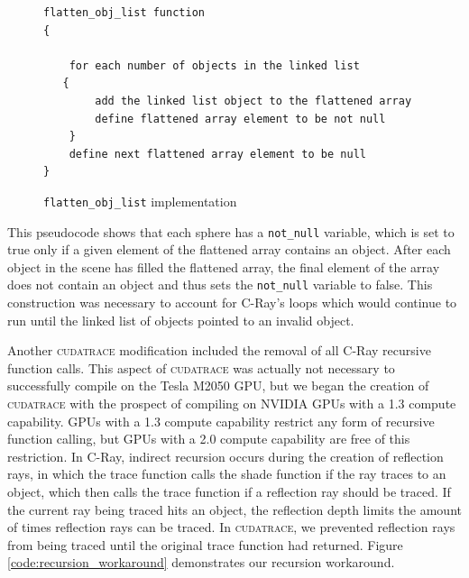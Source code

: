 \documentclass[12pt]{article}
\begin{document}
\begin{figure}
    \caption{\texttt{flatten\_obj\_list} implementation} \label{code:flatten_obj_list}
\begin{lstlisting}
flatten_obj_list function
{
   
    for each number of objects in the linked list 
   {
        add the linked list object to the flattened array
        define flattened array element to be not null
    }
    define next flattened array element to be null 
}
\end{lstlisting}
\end{figure}

This pseudocode shows that each sphere has a \texttt{not\_null} variable, which is set to true only if a given element of the flattened array contains an object. After each object in the scene has filled the flattened array, the final element of the array does not contain an object and thus sets the \texttt{not\_null} variable to false. This construction was necessary to account for C-Ray's loops which would continue to run until the linked list of objects pointed to an invalid object.

Another \textsc{cudatrace} modification included the removal of all C-Ray recursive function calls. This aspect of \textsc{cudatrace} was actually not necessary to successfully compile on the Tesla M2050 GPU, but we began the creation of \textsc{cudatrace} with the prospect of compiling on NVIDIA GPUs with a 1.3 compute capability. GPUs with a 1.3 compute capability restrict any form of recursive function calling, but GPUs with a 2.0 compute capability are free of this restriction. In C-Ray, indirect recursion occurs during the creation of reflection rays, in which the trace function calls the shade function if the ray traces to an object, which then calls the trace function if a reflection ray should be traced. If the current ray being traced hits an object, the reflection depth limits the amount of times reflection rays can be traced. In \textsc{cudatrace}, we prevented reflection rays from being traced until the original trace function had returned. Figure \ref{code:recursion_workaround} demonstrates our recursion workaround.
\end{document}
